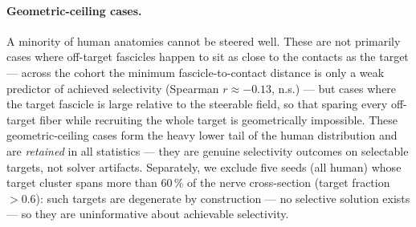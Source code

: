 \paragraph{Geometric-ceiling cases.}
A minority of human anatomies cannot be steered well.  These are not
primarily cases where off-target fascicles happen to sit as close to the
contacts as the target --- across the cohort the minimum
fascicle-to-contact distance is only a weak predictor of achieved
selectivity (Spearman $r \approx -0.13$, n.s.) --- but cases where the
target fascicle is large relative to the steerable field, so that sparing
every off-target fiber while recruiting the whole target is geometrically
impossible.  These geometric-ceiling cases form the heavy lower tail of
the human distribution and are \emph{retained} in all statistics ---
they are genuine selectivity outcomes on selectable targets, not solver
artifacts.  Separately, we exclude five seeds (all human) whose target
cluster spans more than $60\,\%$ of the nerve cross-section (target
fraction $> 0.6$): such targets are degenerate by construction --- no
selective solution exists --- so they are uninformative about achievable
selectivity.

